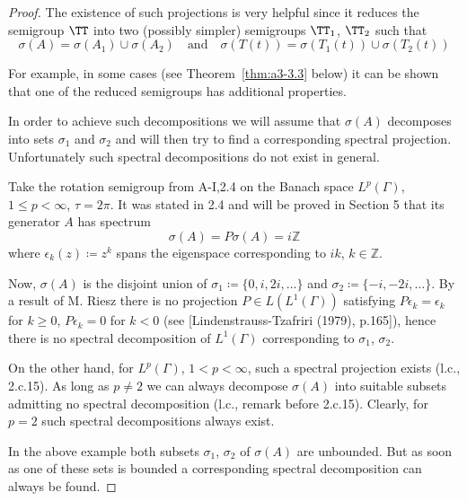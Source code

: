 \begin{proof}
The existence of such projections is very helpful since it reduces the semigroup $\TT$ into two (possibly simpler) semigroups $\TT_{1}$, $\TT_{2}$ such that
\[
\sigma(A) = \sigma(A_{1}) \cup \sigma(A_{2}) \quad \text{and} \quad \sigma(T(t)) = \sigma(T_{1}(t)) \cup \sigma(T_{2}(t))
\]

For example, in some cases (see Theorem~\ref{thm:a3-3.3} below) it can be shown that one of the reduced semigroups has additional properties.

In order to achieve such decompositions we will assume that $\sigma(A)$ decomposes into sets $\sigma_{1}$ and $\sigma_{2}$ and will then try to find a corresponding spectral projection.
Unfortunately such spectral decompositions do not exist in general.

\begin{example}\label{ex:a3-3.2}
	
	Take the rotation semigroup from A-I,2.4 on the Banach space $L^{p}(\Gamma)$, $1 \leq p < \infty$, $\tau = 2\pi$.
	It was stated in 2.4 and will be proved in Section 5 that its generator $A$ has spectrum
	\[
	\sigma(A) = P\sigma(A) = i\mathbb{Z}
	\]
	where $\epsilon_{k}(z) \coloneqq z^{k}$ spans the eigenspace corresponding to $ik$, $k \in \mathbb{Z}$.
	
	Now, $\sigma(A)$ is the disjoint union of $\sigma_{1} \coloneqq \{0,i,2i,\ldots\}$ and $\sigma_{2} \coloneqq \{-i,-2i,\ldots\}$.
	By a result of M. Riesz there is no projection $P \in L(L^{1}(\Gamma))$ satisfying $P\epsilon_{k} = \epsilon_{k}$ for $k \geq 0$, $P\epsilon_{k} = 0$ for $k < 0$ (see [Lindenstrauss-Tzafriri (1979), p.165]), hence there is no spectral decomposition of $L^{1}(\Gamma)$ corresponding to $\sigma_{1}$, $\sigma_{2}$.
	
	On the other hand, for $L^{p}(\Gamma)$, $1 < p < \infty$, such a spectral projection exists (l.c., 2.c.15).
	As long as $p \neq 2$ we can always decompose $\sigma(A)$ into suitable subsets admitting no spectral decomposition (l.c., remark before 2.c.15).
	Clearly, for $p = 2$ such spectral decompositions always exist.
\end{example}

\newpage

In the above example both subsets $\sigma_{1}$, $\sigma_{2}$ of $\sigma(A)$ are unbounded.
But as soon as one of these sets is bounded a corresponding spectral decomposition can always be found.


\end{proof}
